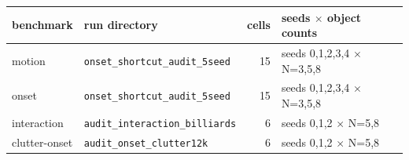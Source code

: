 \begin{tabular}{llrl}
\toprule
benchmark & run directory & cells & seeds $\times$ object counts \\
\midrule
motion & \texttt{onset\_shortcut\_audit\_5seed} & 15 & seeds 0,1,2,3,4 $\times$ N=3,5,8 \\
onset & \texttt{onset\_shortcut\_audit\_5seed} & 15 & seeds 0,1,2,3,4 $\times$ N=3,5,8 \\
interaction & \texttt{audit\_interaction\_billiards} & 6 & seeds 0,1,2 $\times$ N=5,8 \\
clutter-onset & \texttt{audit\_onset\_clutter12k} & 6 & seeds 0,1,2 $\times$ N=5,8 \\
\bottomrule
\end{tabular}
